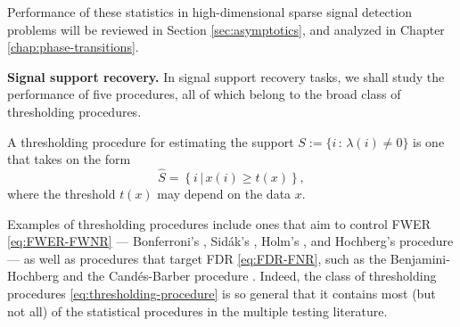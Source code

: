 Performance of these statistics in high-dimensional sparse signal detection problems will be reviewed in Section \ref{sec:asymptotics}, and analyzed in Chapter \ref{chap:phase-transitions}.

\medskip

{\bf Signal support recovery.}
In signal support recovery tasks, we shall study the performance of five procedures, all of which belong to the broad class of thresholding procedures.
\begin{definition}
A thresholding procedure for estimating the support 
$S:=\{i\, :\, \lambda(i)\neq0\}$ is one that takes on the form
\begin{equation} \label{eq:thresholding-procedure}
    \widehat{S} = \left\{i\,|\,x(i) \ge t(x)\right\},
\end{equation}
where the threshold $t(x)$ may depend on the data $x$.
\end{definition}

Examples of thresholding procedures include ones that aim to control FWER \eqref{eq:FWER-FWNR} --- Bonferroni's \cite{dunn1961multiple}, Sid\'ak's \citep{vsidak1967rectangular}, Holm's \citep{holm1979simple}, and Hochberg's procedure \citep{hochberg1988sharper} --- as well as procedures that target FDR \eqref{eq:FDR-FNR}, such as the Benjamini-Hochberg \cite{benjamini1995controlling} and the Cand\'es-Barber procedure \cite{barber2015controlling}.
Indeed, the class of thresholding procedures \eqref{eq:thresholding-procedure} is so general that it contains most (but not all) of the statistical procedures in the multiple testing literature.



